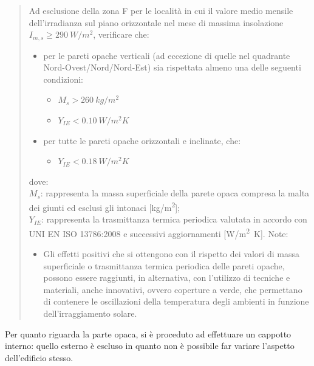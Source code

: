 \begin{quote}
	Ad esclusione della zona F per le località in cui il valore medio mensile dell'irradianza sul piano orizzontale nel mese di massima insolazione $I_{m,s} \ge \SI{290}{W/m^2}$, verificare che:
	\begin{itemize}
		\item per le pareti opache verticali (ad eccezione di quelle nel quadrante Nord-Ovest/Nord/Nord-Est) sia rispettata almeno una delle seguenti condizioni:
		\begin{itemize}
			\item $M_s > \SI{260}{kg/m^2}$
			\item $Y_{IE}<\SI{0.10}{W/m^2K}$
		\end{itemize}
		\item per tutte le pareti opache orizzontali e inclinate, che:
		\begin{itemize}
			\item $Y_{IE}<\SI{0.18}{W/m^2K}$
		\end{itemize}
	\end{itemize}
	dove:\\
	$M_s$: rappresenta la massa superficiale della parete opaca compresa la malta dei giunti ed esclusi gli intonaci [\si{kg/m^2}];\\
	$Y_{IE}$: rappresenta la trasmittanza termica periodica valutata in accordo con UNI EN ISO 13786:2008 e successivi aggiornamenti [\si{W/m^2K}].
	\newpage
	Note:
	\begin{itemize}
		\item Gli effetti positivi che si ottengono con il rispetto dei valori di massa superficiale o trasmittanza termica periodica delle pareti opache, possono essere raggiunti, in alternativa, con l'utilizzo di tecniche e materiali, anche innovativi, ovvero coperture a verde, che permettano di contenere le oscillazioni della temperatura degli ambienti in funzione dell'irraggiamento solare. \sdots
	\end{itemize}
\end{quote}

Per quanto riguarda la parte opaca, si è proceduto ad effettuare un cappotto interno: quello esterno è escluso in quanto non è possibile far variare l'aspetto dell'edificio stesso. 

